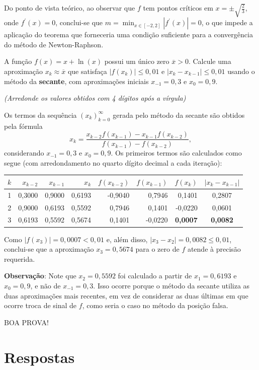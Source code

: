 \documentclass[12pt,a4paper]{article}
\begin{document}
\begin{ExerciseList}
Do ponto de vista teórico, ao observar que \(f\) tem pontos críticos em \(x = \pm\sqrt{\frac{2}{3}}\), onde \(f^\prime(x) = 0\), conclui-se que \(m = \min_{x \in [-2, 2]} |f^\prime(x)| = 0\), o que impede a aplicação do teorema que forneceria uma condição suficiente para a convergência do método de Newton-Raphson.


\Exercise[title={2,5}] A função \(f(x) = x + \ln(x)\) possui um único zero \(\overline{x} > 0\). Calcule uma aproximação \(x_k \approx \overline{x}\) que satisfaça \( |f(x_k)| \leq 0,01 \) e \( |x_k - x_{k-1}| \leq 0,01 \) usando o método da \textbf{secante}, com aproximações iniciais \(x_{-1} = 0,3\) e \(x_0 = 0,9\).

{\color{blue} \textit{(Arredonde os valores obtidos com 4 dígitos após a vírgula)}}

\Answer Os termos da sequência \((x_k)_{k=0}^\infty\) gerada pelo método da secante são obtidos pela fórmula
\[
x_k = \dfrac{x_{k-2}f(x_{k-1}) - x_{k-1}f(x_{k-2})}{f(x_{k-1}) - f(x_{k-2})},
\]
considerando \(x_{-1} = 0,3\) e \(x_0 = 0,9\). Os primeiros termos são calculados como segue (com arredondamento no quarto dígito decimal a cada iteração):
\medskip
\begin{center}
\begin{tabular}{rrrrrrrc}
\hline
$k$ & $x_{k-2}$ & $x_{k-1}$ & $x_k$ & $f(x_{k-2})$ & $f(x_{k-1})$ & $f(x_k)$ & $|x_k - x_{k-1}|$ \\
\hline
1 & 0,3000 & 0,9000 & 0,6193 & -0,9040 & 0,7946 & 0,1401 & 0,2807 \\
2 & 0,9000 & 0,6193 & 0,5592 & 0,7946 & 0,1401 & -0,0220 & 0,0601 \\
3 & 0,6193 & 0,5592 & 0,5674 & 0,1401 & -0,0220 & \textbf{0,0007} & \textbf{0,0082} \\
\hline
\end{tabular}
\end{center}
\medskip
Como \( |f(x_3)| = 0,0007 < 0,01 \) e, além disso, \( |x_3 - x_2| = 0,0082 \leq 0,01 \), conclui-se que a aproximação \(x_3 = 0,5674\) para o zero de \(f\) atende à precisão requerida.

\textbf{Observação}: Note que \(x_2 = 0,5592\) foi calculado a partir de \(x_1 = 0,6193\) e \(x_0 = 0,9\), e não de \(x_{-1} = 0,3\). Isso ocorre porque o método da secante utiliza as duas aproximações mais recentes, em vez de considerar as duas últimas em que ocorre troca de sinal de \(f\), como seria o caso no método da posição falsa.
\end{ExerciseList}

\vfill
\begin{center}
BOA PROVA!
\end{center}

\newpage
\restoregeometry
\section*{Respostas}
\shipoutAnswer
\end{document}
